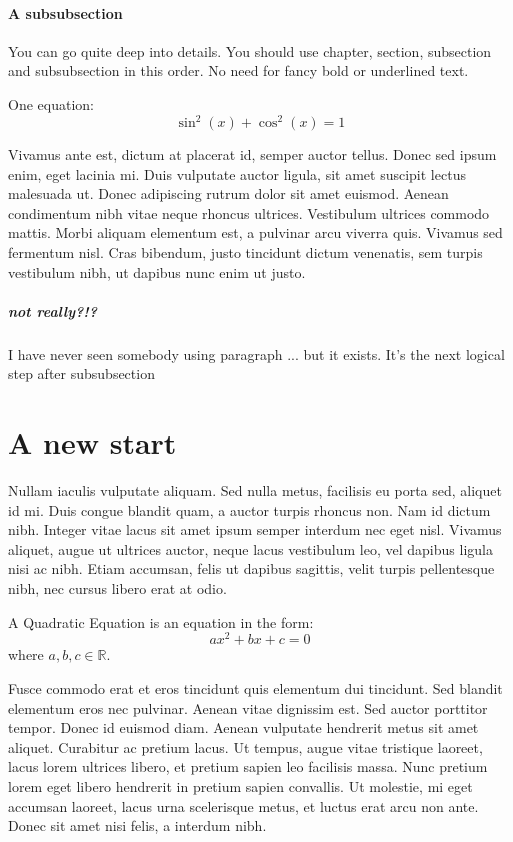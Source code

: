 \documentclass[11pt,a4paper,oneside]{report}
\begin{document}
\subsubsection{A subsubsection}
You can go quite deep into details. You should use chapter, section,
subsection and subsubsection in this order. No need for fancy bold or
underlined text.

One equation:
\begin{equation}
    \sin^2(x) + \cos^2(x) = 1
\end{equation}

Vivamus ante est, dictum at placerat id, semper auctor tellus. Donec
sed ipsum enim, eget lacinia mi. Duis vulputate auctor ligula, sit
amet suscipit lectus malesuada ut. Donec adipiscing rutrum dolor sit
amet euismod. Aenean condimentum nibh vitae neque rhoncus ultrices.
Vestibulum ultrices commodo mattis. Morbi aliquam elementum est, a
pulvinar arcu viverra quis. Vivamus sed fermentum nisl. Cras
bibendum, justo tincidunt dictum venenatis, sem turpis vestibulum
nibh, ut dapibus nunc enim ut justo.

\paragraph{not really?!?}
I have never seen somebody using paragraph ... but it exists. It's
the next logical step after subsubsection

\chapter{A new start}
Nullam iaculis vulputate
aliquam. Sed nulla metus, facilisis eu porta sed, aliquet id mi.
Duis congue blandit quam, a auctor turpis rhoncus non. Nam id dictum
nibh. Integer vitae lacus sit amet ipsum semper interdum nec eget
nisl. Vivamus aliquet, augue ut ultrices auctor, neque lacus
vestibulum leo, vel dapibus ligula nisi ac nibh. Etiam accumsan,
felis ut dapibus sagittis, velit turpis pellentesque nibh, nec cursus
libero erat at odio.

A Quadratic Equation is an equation in the form:
\begin{equation}
    ax^2+bx+c=0
\end{equation}
where \(a,b,c\in\mathbb{R}\).

Fusce commodo erat et eros tincidunt quis elementum dui tincidunt.
Sed blandit elementum eros nec pulvinar. Aenean vitae dignissim est.
Sed auctor porttitor tempor. Donec id euismod diam. Aenean vulputate
hendrerit metus sit amet aliquet. Curabitur ac pretium lacus. Ut
tempus, augue vitae tristique laoreet, lacus lorem ultrices libero,
et pretium sapien leo facilisis massa. Nunc pretium lorem eget libero
hendrerit in pretium sapien convallis. Ut molestie, mi eget accumsan
laoreet, lacus urna scelerisque metus, et luctus erat arcu non ante.
Donec sit amet nisi felis, a interdum nibh.
\end{document}
